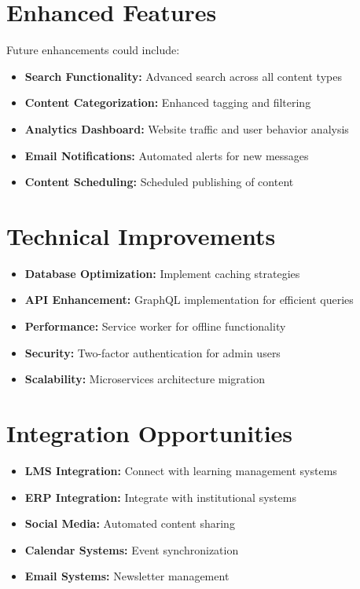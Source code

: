 \documentclass[12pt,a4paper]{report}
\begin{document}
\section{Enhanced Features}
Future enhancements could include:
\begin{itemize}
    \item \textbf{Search Functionality:} Advanced search across all content types
    \item \textbf{Content Categorization:} Enhanced tagging and filtering
    \item \textbf{Analytics Dashboard:} Website traffic and user behavior analysis
    \item \textbf{Email Notifications:} Automated alerts for new messages
    \item \textbf{Content Scheduling:} Scheduled publishing of content
\end{itemize}

\section{Technical Improvements}
\begin{itemize}
    \item \textbf{Database Optimization:} Implement caching strategies
    \item \textbf{API Enhancement:} GraphQL implementation for efficient queries
    \item \textbf{Performance:} Service worker for offline functionality
    \item \textbf{Security:} Two-factor authentication for admin users
    \item \textbf{Scalability:} Microservices architecture migration
\end{itemize}

\section{Integration Opportunities}
\begin{itemize}
    \item \textbf{LMS Integration:} Connect with learning management systems
    \item \textbf{ERP Integration:} Integrate with institutional systems
    \item \textbf{Social Media:} Automated content sharing
    \item \textbf{Calendar Systems:} Event synchronization
    \item \textbf{Email Systems:} Newsletter management
\end{itemize}
\end{document}
